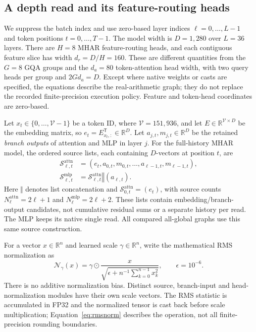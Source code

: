 \documentclass[11pt,letterpaper]{article}
\begin{document}
\subsection{A depth read and its feature-routing heads}
We suppress the batch index and use zero-based layer indices
$\ell=0,\ldots,L-1$ and token positions $t=0,\ldots,T-1$. The model width is
$D=1,280$ over $L=36$ layers. There are $H=8$ MHAR feature-routing heads,
and each contiguous feature slice has width $d_r=D/H=160$.
These are different quantities from the
$G=8$ GQA groups and the $d_a=80$ token-attention head width, with two query
heads per group and $2Gd_a=D$.
Except where native weights or casts are specified, the equations describe
the real-arithmetic graph; they do not replace the recorded finite-precision
execution policy. Feature and token-head coordinates are zero-based.

Let $x_t\in\{0,\ldots,\mathcal V-1\}$ be a token ID, where
$\mathcal V=151{,}936$, and let $E\in\mathbb R^{\mathcal V\times D}$ be the
embedding matrix, so $e_t=E_{x_t,:}^{\mathsf T}\in\mathbb R^D$.
Let $a_{j,t},m_{j,t}\in\mathbb{R}^{D}$ be the retained \emph{branch outputs} of
attention and MLP in layer $j$. For the full-history MHAR model,
the ordered source lists, each containing $D$-vectors at position $t$, are
\begin{align}
 \mathcal{S}^{\mathrm{attn}}_{\ell,t}
   &= (e_t,a_{0,t},m_{0,t},\ldots,a_{\ell-1,t},m_{\ell-1,t}),\\
 \mathcal{S}^{\mathrm{mlp}}_{\ell,t}
   &= \mathcal{S}^{\mathrm{attn}}_{\ell,t}\mathbin{\Vert}(a_{\ell,t}).
 \label{eq:sources}
\end{align}
Here $\Vert$ denotes list concatenation and
$\mathcal{S}^{\mathrm{attn}}_{0,t}=(e_t)$, with source counts
$N^{\mathrm{attn}}_\ell=2\ell+1$ and $N^{\mathrm{mlp}}_\ell=2\ell+2$.
These lists contain embedding/branch-output candidates, not cumulative
residual sums or a separate history per read. The MLP keeps its native single read. All compared all-global
graphs use this same source construction.

For a vector $x\in\mathbb{R}^{n}$ and learned scale
$\gamma\in\mathbb{R}^{n}$, write the mathematical RMS normalization as
\begin{equation}
 \mathcal{N}_{\gamma}(x)
 =\gamma\odot\frac{x}{\sqrt{\epsilon+n^{-1}\sum_{k=0}^{n-1}x_k^2}},
 \qquad \epsilon=10^{-6}.
 \label{eq:rmsnorm}
\end{equation}
There is no additive normalization bias. Distinct source, branch-input and
head-normalization modules have their own scale vectors. The RMS statistic
is accumulated in FP32 and the normalized tensor is cast
back before scale multiplication; Equation~\ref{eq:rmsnorm} describes the
operation, not all finite-precision rounding boundaries.
\end{document}
